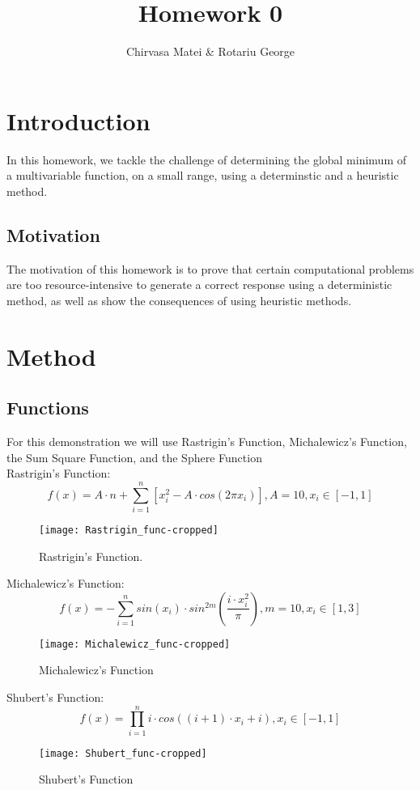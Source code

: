 \documentclass{article}
\author{Chirvasa Matei \& Rotariu George}
\title{Homework 0}
\begin{document}
\maketitle

\section{Introduction}
In this homework, we tackle the challenge of determining the global minimum of a multivariable function, on a small range, using a determinstic and a heuristic method.
\subsection{Motivation}
The motivation of this homework is to prove that certain computational problems are too resource-intensive to generate a correct response using a deterministic method, as well as show the consequences of using heuristic methods.

\section{Method}
\subsection{Functions}
For this demonstration we will use Rastrigin's Function\cite{Rastrigin}, Michalewicz's Function\cite{Michalwicz}, the Sum Square Function\cite{SumSquare}, and the Sphere Function\cite{Sphere}
\\Rastrigin's Function:
$$ f(x) = A \cdot n + \sum_{i=1}^n \left[ x_i^2 - A \cdot cos(2 \pi x_i) \right],
A = 10, x_i \in \left[ -1, 1 \right]$$

\begin{figure}[H]
  \texttt{[image: Rastrigin\_func-cropped]}
  \caption{Rastrigin's Function.}
\end{figure}

Michalewicz's Function:
$$ f(x) = - \sum_{i=1}^n sin(x_i) \cdot sin^{2m}\left(\frac{i \cdot x_i^2}{\pi}\right),
m = 10, x_i \in \left[ 1, 3 \right]$$
\begin{figure}[H]
  \texttt{[image: Michalewicz\_func-cropped]}
  \caption{Michalewicz's Function}
\end{figure}

Shubert's Function:
$$ f(x) = \prod_{i = 1}^n i \cdot cos\left(\left(i + 1\right) \cdot x_i + i\right), x_i \in \left[ -1, 1 \right]$$
\begin{figure}[H]
  \texttt{[image: Shubert\_func-cropped]}
  \caption{Shubert's Function}
\end{figure}
\end{document}
